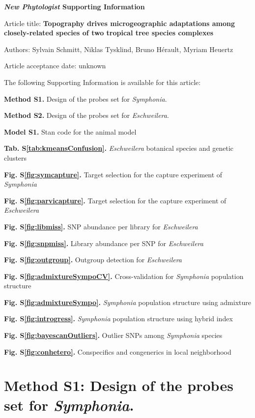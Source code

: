 \documentclass[12pt,]{article}
\begin{document}
\textbf{\emph{New Phytologist} Supporting Information}

Article title: \textbf{Topography drives microgeographic adaptations among closely-related species of two tropical tree species complexes}

Authors: Sylvain Schmitt, Niklas Tysklind, Bruno Hérault, Myriam Heuertz

Article acceptance date: unknown

The following Supporting Information is available for this article:

\textbf{Method S1.} Design of the probes set for \emph{Symphonia}.

\textbf{Method S2.} Design of the probes set for \emph{Eschweilera}.

\textbf{Model S1.} Stan code for the animal model

\textbf{Tab. S\ref{tab:kmeansConfusion}.} \emph{Eschweilera} botanical species and genetic clusters

\textbf{Fig. S\ref{fig:symcapture}.} Target selection for the capture experiment of \emph{Symphonia}

\textbf{Fig. S\ref{fig:parvicapture}.} Target selection for the capture experiment of \emph{Eschweilera}

\textbf{Fig. S\ref{fig:libmiss}.} SNP abundance per library for \emph{Eschweilera}

\textbf{Fig. S\ref{fig:snpmiss}.} Library abundance per SNP for \emph{Eschweilera}

\textbf{Fig. S\ref{fig:outgroup}.} Outgroup detection for \emph{Eschweilera}

\textbf{Fig. S\ref{fig:admixtureSympoCV}.} Cross-validation for \emph{Symphonia} population structure

\textbf{Fig. S\ref{fig:admixtureSympo}.} \emph{Symphonia} population structure using admixture

\textbf{Fig. S\ref{fig:introgress}.} \emph{Symphonia} population structure using hybrid index

\textbf{Fig. S\ref{fig:bayescanOutliers}.} Outlier SNPs among \emph{Symphonia} species

\textbf{Fig. S\ref{fig:conhetero}.} Conspecifics and congenerics in local neighborhood

\newpage

\hypertarget{method-s1-design-of-the-probes-set-for-symphonia.}{%
\section{\texorpdfstring{Method S1: Design of the probes set for \emph{Symphonia}.}{Method S1: Design of the probes set for Symphonia.}}\label{method-s1-design-of-the-probes-set-for-symphonia.}}
\end{document}
